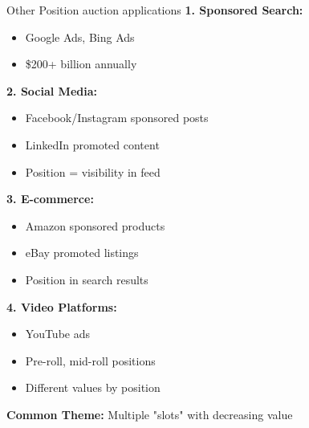 \documentclass[xcolor={x11names}, aspectratio=169 ]{beamer}
\begin{document}
\begin{frame}{Other Position auction applications}
\textbf{1. Sponsored Search:}
\begin{itemize}
  \item Google Ads, Bing Ads
  \item \$200+ billion annually
\end{itemize}

\textbf{2. Social Media:}
\begin{itemize}
  \item Facebook/Instagram sponsored posts
  \item LinkedIn promoted content
  \item Position = visibility in feed
\end{itemize}

\textbf{3. E-commerce:}
\begin{itemize}
  \item Amazon sponsored products
  \item eBay promoted listings
  \item Position in search results
\end{itemize}

\textbf{4. Video Platforms:}
\begin{itemize}
  \item YouTube ads
  \item Pre-roll, mid-roll positions
  \item Different values by position
\end{itemize}

\textbf{Common Theme:} Multiple "slots" with decreasing value
\end{frame}
\end{document}
